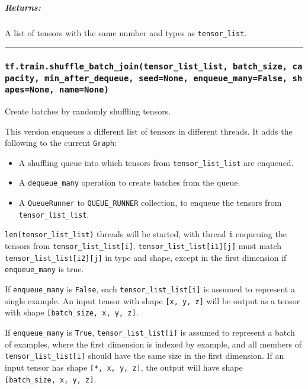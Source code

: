 \subparagraph{Returns: }\label{returns-56}

A list of tensors with the same number and types as
\texttt{tensor\_list}.

\begin{center}\rule{0.5\linewidth}{\linethickness}\end{center}

\subsubsection{\texorpdfstring{\texttt{tf.train.shuffle\_batch\_join(tensor\_list\_list,\ batch\_size,\ capacity,\ min\_after\_dequeue,\ seed=None,\ enqueue\_many=False,\ shapes=None,\ name=None)}
}{tf.train.shuffle\_batch\_join(tensor\_list\_list, batch\_size, capacity, min\_after\_dequeue, seed=None, enqueue\_many=False, shapes=None, name=None) }}\label{tf.train.shuffleux5fbatchux5fjointensorux5flistux5flist-batchux5fsize-capacity-minux5fafterux5fdequeue-seednone-enqueueux5fmanyfalse-shapesnone-namenone}

Create batches by randomly shuffling tensors.

This version enqueues a different list of tensors in different threads.
It adds the following to the current \texttt{Graph}:

\begin{itemize}
\tightlist
\item
  A shuffling queue into which tensors from \texttt{tensor\_list\_list}
  are enqueued.
\item
  A \texttt{dequeue\_many} operation to create batches from the queue.
\item
  A \texttt{QueueRunner} to \texttt{QUEUE\_RUNNER} collection, to
  enqueue the tensors from \texttt{tensor\_list\_list}.
\end{itemize}

\texttt{len(tensor\_list\_list)} threads will be started, with thread
\texttt{i} enqueuing the tensors from
\texttt{tensor\_list\_list{[}i{]}}.
\texttt{tensor\_list\_list{[}i1{]}{[}j{]}} must match
\texttt{tensor\_list\_list{[}i2{]}{[}j{]}} in type and shape, except in
the first dimension if \texttt{enqueue\_many} is true.

If \texttt{enqueue\_many} is \texttt{False}, each
\texttt{tensor\_list\_list{[}i{]}} is assumed to represent a single
example. An input tensor with shape \texttt{{[}x,\ y,\ z{]}} will be
output as a tensor with shape \texttt{{[}batch\_size,\ x,\ y,\ z{]}}.

If \texttt{enqueue\_many} is \texttt{True},
\texttt{tensor\_list\_list{[}i{]}} is assumed to represent a batch of
examples, where the first dimension is indexed by example, and all
members of \texttt{tensor\_list\_list{[}i{]}} should have the same size
in the first dimension. If an input tensor has shape
\texttt{{[}*,\ x,\ y,\ z{]}}, the output will have shape
\texttt{{[}batch\_size,\ x,\ y,\ z{]}}.

